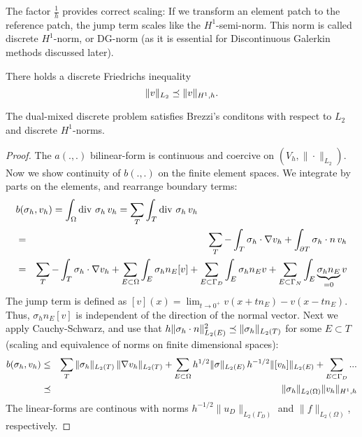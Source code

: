The factor $\tfrac{1}{h}$ provides correct scaling: If we transform an
element patch to the reference patch, the jump term scales like the $H^1$-semi-norm. 
This norm is called discrete $H^1$-norm, or DG-norm (as it is essential for Discontinuous Galerkin methods discussed later).

There holds a discrete Friedrichs inequality
$$
\| v \|_{L_2} \preceq \| v \|_{H^1,h}.
$$

\medskip

\begin{theorem} \label{theo_mixeddiscretenorms}
The dual-mixed discrete problem satisfies Brezzi's conditons with respect to $L_2$ and discrete $H^1$-norms.
\end{theorem}
\begin{proof} The $a(.,.)$ bilinear-form is continuous and coercive on $(V_h, \| \cdot \|_{L_2})$. 
Now we show continuity of $b(.,.)$ on the finite element spaces. We integrate by parts on the elements, and rearrange boundary terms:
\begin{eqnarray*}
\lefteqn{b(\sigma_h, v_h) = \int_\Omega \opdiv \, \sigma_h \, v_h = \sum_T \int_T \opdiv \, \sigma_h \, v_h} \\
& = & \sum_T -\int_T \sigma_h \cdot \nabla v_h + \int_{\partial T} \sigma_h \cdot n \, v_h \\
& = & \sum_T - \int_T \sigma_h \cdot \nabla v_h + \sum_{E \subset \Omega} \int_E \sigma_h n_E [v] + \sum_{E \subset \Gamma_D} \int_E \sigma_h n_E v  + \sum_{E \subset \Gamma_N} \int_E \underbrace{\sigma_h n_E}_{=0} v 
\end{eqnarray*}
The jump term is defined as $[v](x) = \lim_{t \rightarrow 0^+} v(x+t
n_E) - v(x-t n_E)$. Thus, $\sigma_h n_E [v]$ is independent of
the direction of the normal vector.
Next we apply Cauchy-Schwarz, and use that $h \| \sigma_h \cdot n \|_{L_2(E)}^2 \preceq \| \sigma_h \|_{L_2(T)}$ for some $E \subset T$ (scaling and equivalence of norms on finite dimensional spaces):
\begin{eqnarray*}
b(\sigma_h, v_h) & \leq & \sum_T \| \sigma_h \|_{L_2(T)} \, \| \nabla v_h \|_{L_2(T)}  + \sum_{E \subset \Omega}  h^{1/2} \| \sigma \|_{L_2(E)} \, h^{-1/2} \| [v_h]\|_{L_2(E)}   + \sum_{E \subset \Gamma_D} ...  \\
& \preceq &  \| \sigma_h \|_{L_2(\Omega)}  \|  v_h \|_{H^1,h}
\end{eqnarray*}
The linear-forms are continous with norms $h^{-1/2} \| u_D \|_{L_2(\Gamma_D)}$ and $\| f \|_{L_2(\Omega)}$, respectively.


\end{proof}
